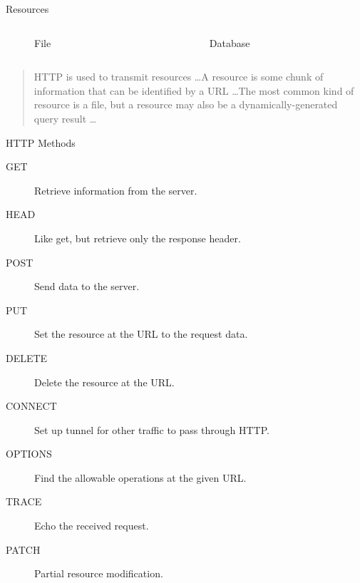 \begin{frame}{Resources}
 \begin{columns}[onlytextwidth]
   \begin{column}{0.5\textwidth}
     \centering
      \begin{figure}
        \caption*{File}
      \end{figure}
    \end{column}
    \begin{column}{0.5\textwidth}
      \centering
      \begin{figure}
      \caption*{Database}
      \end{figure}
    \end{column}
  \end{columns}
  
  \begin{quote}
    HTTP is used to transmit resources \ldots A resource is some chunk of information that can be identified by a URL \ldots The most common kind of resource is a file, but a resource may also be a dynamically-generated query result \ldots
  \end{quote}
\end{frame}


\begin{frame}{HTTP Methods}
  \begin{description}
    \item[GET] Retrieve information from the server.
    \item[HEAD] Like get, but retrieve only the response header.
    \item[POST] Send data to the server.
    \item[PUT] Set the resource at the URL to the request data.
    \item[DELETE] Delete the resource at the URL.
    \item[CONNECT] Set up tunnel for other traffic to pass through HTTP.
    \item[OPTIONS] Find the allowable operations at the given URL.
    \item[TRACE] Echo the received request.
    \item[PATCH] Partial resource modification.
  \end{description}
\end{frame}


